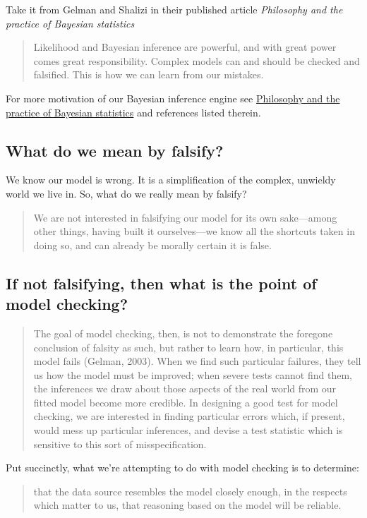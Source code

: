 \documentclass[]{article}
\begin{document}
Take it from Gelman and Shalizi in their published article \emph{Philosophy and the practice of Bayesian statistics} 
\begin{quote}
Likelihood and Bayesian inference are powerful, and with great power comes great responsibility. Complex models can and should be checked and falsified. This is how we can learn from our mistakes.
\end{quote}

For more motivation of our Bayesian inference engine see \href{http://www.stat.columbia.edu/~gelman/research/published/philosophy.pdf}{Philosophy and the practice of Bayesian statistics}  and references listed therein.

\subsection{What do we mean by falsify?}

We know our model is wrong. It is a simplification of the complex, unwieldy world we live in. So, what do we really mean by falsify? 
\begin{quote} 
We are not interested in falsifying our model for its own sake---among other things, having built it ourselves---we know all the shortcuts taken in doing so, and can already be morally certain it is false.
\end{quote}

\subsection{If not falsifying, then what is the point of model checking?}

\begin{quote}
The goal of model checking, then, is not to demonstrate the foregone
conclusion of falsity as such, but rather to learn how, in particular,
this model fails (Gelman, 2003). When we find such particular failures,
they tell us how the model must be improved; when severe tests cannot
find them, the inferences we draw about those aspects of the real world
from our fitted model become more credible. In designing a good test for
model checking, we are interested in finding particular errors which, if
present, would mess up particular inferences, and devise a test
statistic which is sensitive to this sort of misspecification.
\end{quote}

Put succinctly, what we're attempting to do with model checking is to
determine: 
\begin{quote} 
that the data source resembles the model closely enough, in the respects which matter to us, that reasoning based on the model will be reliable.
\end{quote}
\end{document}
